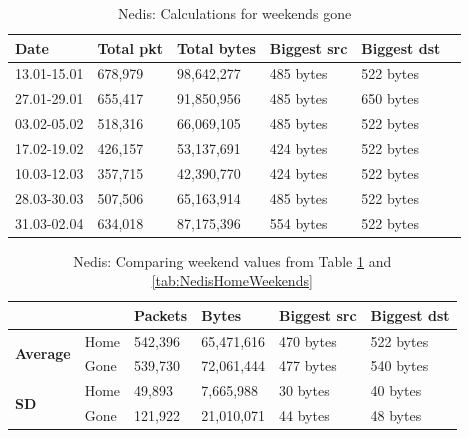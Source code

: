 \begin{table}[H]
    \centering
    \caption{Nedis: Calculations for weekends gone}
    \begin{tabular}{|l|l|l|l|l|l|}
        \hline
        \textbf{Date} & \textbf{Total pkt} & \textbf{Total bytes} & \textbf{Biggest src} & \textbf{Biggest dst} \\ \hline
        13.01-15.01   & 678,979            & 98,642,277           & 485 bytes            & 522 bytes            \\ \hline
        27.01-29.01   & 655,417            & 91,850,956           & 485 bytes            & 650 bytes            \\ \hline
        03.02-05.02   & 518,316            & 66,069,105           & 485 bytes            & 522 bytes            \\ \hline
        17.02-19.02   & 426,157            & 53,137,691           & 424 bytes            & 522 bytes            \\ \hline
        10.03-12.03   & 357,715            & 42,390,770           & 424 bytes            & 522 bytes            \\ \hline
        28.03-30.03   & 507,506            & 65,163,914           & 485 bytes            & 522 bytes            \\ \hline
        31.03-02.04   & 634,018            & 87,175,396           & 554 bytes            & 522 bytes            \\ \hline
    \end{tabular}
    \label{tab:NedisGoneWeekends}
\end{table}

\begin{table}[H]
    \centering
    \caption{Nedis: Comparing weekend values from Table \ref{tab:NedisGoneWeekends} and \ref{tab:NedisHomeWeekends}}
    \begin{tabular}{ll|l|l|l|l|}
        \cline{3-6}
        \textbf{}                                           & \textbf{} & \textbf{Packets} & \textbf{Bytes} & \textbf{Biggest src} & \textbf{Biggest dst} \\ \hline
        \multicolumn{1}{|l|}{\multirow{2}{*}{\textbf{Average}}} & Home      & 542,396          & 65,471,616     & 470 bytes            & 522 bytes            \\ \cline{2-6} 
        \multicolumn{1}{|l|}{}                              & Gone      & 539,730          & 72,061,444     & 477 bytes            & 540 bytes            \\ \hline
        \multicolumn{1}{|l|}{\multirow{2}{*}{\textbf{SD}}}  & Home      & 49,893           & 7,665,988      & 30 bytes             & 40 bytes             \\ \cline{2-6} 
        \multicolumn{1}{|l|}{}                              & Gone      & 121,922          & 21,010,071     & 44 bytes             & 48 bytes             \\ \hline
    \end{tabular}
    \label{tab:NedisWeekends}
\end{table}

